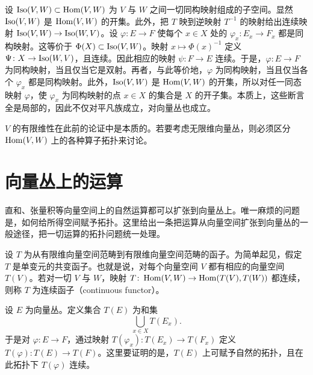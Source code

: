 设 $\operatorname{Iso}(V,W)\subset\operatorname{Hom}(V,W)$ 为 $V$ 与 $W$ 之间一切同构映射组成的子空间。显然 $\operatorname{Iso}(V,W)$ 是 $\operatorname{Hom}(V,W)$ 的开集。此外，把 $T$ 映到逆映射 $T^{-1}$ 的映射给出连续映射 $\operatorname{Iso}(V,W)\to\operatorname{Iso}(W,V)$。设 $\varphi\colon E\to F$ 使每个 $x\in X$ 处的 $\varphi_x\colon E_x\to F_x$ 都是同构映射。这等价于 $\Phi(X)\subset\operatorname{Iso}(V,W)$。映射 $x\mapsto\Phi(x)^{-1}$ 定义 $\Psi\colon X\to\operatorname{Iso}(W,V)$，且连续。因此相应的映射 $\psi\colon F\to E$ 连续。于是，$\varphi\colon E\to F$ 为同构映射，当且仅当它是双射。再者，与此等价地，$\varphi$ 为同构映射，当且仅当各个 $\varphi_x$ 都是同构映射。此外，$\operatorname{Iso}(V,W)$ 是 $\operatorname{Hom}(V,W)$ 的开集，所以对任一同态映射 $\varphi$，使 $\varphi_x$ 为同构映射的点 $x\in X$ 的集合是 $X$ 的开子集。本质上，这些断言全是局部的，因此不仅对平凡族成立，对向量丛也成立。


\begin{remark}{}
  $V$ 的有限维性在此前的论证中是本质的。若要考虑无限维向量丛，则必须区分 $\operatorname{Hom}(V,W)$ 上的各种算子拓扑来讨论。
\end{remark}

\section{向量丛上的运算}

直和、张量积等向量空间上的自然运算都可以扩张到向量丛上。唯一麻烦的问题是，如何给所得空间赋予拓扑。这里给出一条把运算从向量空间扩张到向量丛的一般途径，把一切运算的拓扑问题统一处理。

设 $T$ 为从有限维向量空间范畴到有限维向量空间范畴的函子。为简单起见，假定 $T$ 是单变元的共变函子。也就是说，对每个向量空间 $V$ 都有相应的向量空间 $T(V)$。若对一切 $V$ 与 $W$，映射 $T\colon\operatorname{Hom}(V,W)\to\operatorname{Hom}(T(V),T(W))$ 都连续，则称 $T$ 为连续函子（continuous functor）。


设 $E$ 为向量丛。定义集合 $T(E)$ 为和集
\[
\bigcup_{x\in X}T(E_x).
\]
于是对 $\varphi\colon E\to F$，通过映射 $T(\varphi_x)\colon T(E_x)\to T(F_x)$ 定义 $T(\varphi)\colon T(E)\to T(F)$。这里要证明的是，$T(E)$ 上可赋予自然的拓扑，且在此拓扑下 $T(\varphi)$ 连续。

